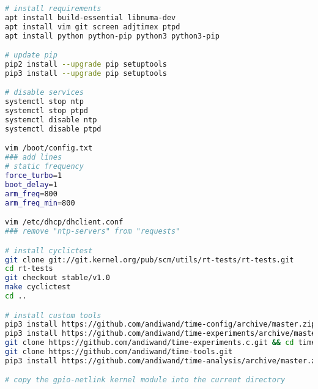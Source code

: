 \begin{lstlisting}[label=lst:env, language=bash, caption=Measurement environment]
# install requirements
apt install build-essential libnuma-dev
apt install vim git screen adjtimex ptpd
apt install python python-pip python3 python3-pip

# update pip
pip2 install --upgrade pip setuptools
pip3 install --upgrade pip setuptools

# disable services
systemctl stop ntp
systemctl stop ptpd
systemctl disable ntp
systemctl disable ptpd

vim /boot/config.txt
### add lines
# static frequency
force_turbo=1
boot_delay=1
arm_freq=800
arm_freq_min=800

vim /etc/dhcp/dhclient.conf
### remove "ntp-servers" from "requests"

# install cyclictest
git clone git://git.kernel.org/pub/scm/utils/rt-tests/rt-tests.git
cd rt-tests
git checkout stable/v1.0
make cyclictest
cd ..

# install custom tools
pip3 install https://github.com/andiwand/time-config/archive/master.zip
pip3 install https://github.com/andiwand/time-experiments/archive/master.zip
git clone https://github.com/andiwand/time-experiments.c.git && cd time-experiments.c && make && cd ..
git clone https://github.com/andiwand/time-tools.git
pip3 install https://github.com/andiwand/time-analysis/archive/master.zip

# copy the gpio-netlink kernel module into the current directory
\end{lstlisting}
